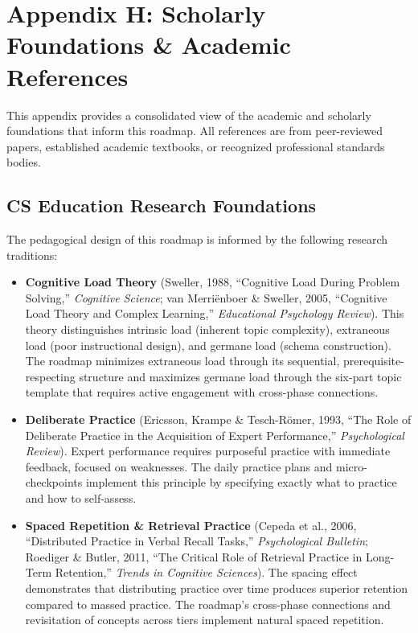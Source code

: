 \documentclass[11pt, a4paper, oneside]{report}
\begin{document}
{{{{{{{{{{{{\chapter[Scholarly Foundations]{Appendix H: Scholarly Foundations \& Academic References}

This appendix provides a consolidated view of the academic and scholarly foundations that inform this roadmap. All references are from peer-reviewed papers, established academic textbooks, or recognized professional standards bodies.

\section*{CS Education Research Foundations}

The pedagogical design of this roadmap is informed by the following research traditions:

\begin{itemize}[leftmargin=*]
\item \textbf{Cognitive Load Theory} (Sweller, 1988, ``Cognitive Load During Problem Solving,'' \emph{Cognitive Science}; van Merri\"enboer \& Sweller, 2005, ``Cognitive Load Theory and Complex Learning,'' \emph{Educational Psychology Review}). This theory distinguishes intrinsic load (inherent topic complexity), extraneous load (poor instructional design), and germane load (schema construction). The roadmap minimizes extraneous load through its sequential, prerequisite-respecting structure and maximizes germane load through the six-part topic template that requires active engagement with cross-phase connections.

\item \textbf{Deliberate Practice} (Ericsson, Krampe \& Tesch-R\"omer, 1993, ``The Role of Deliberate Practice in the Acquisition of Expert Performance,'' \emph{Psychological Review}). Expert performance requires purposeful practice with immediate feedback, focused on weaknesses. The daily practice plans and micro-checkpoints implement this principle by specifying exactly what to practice and how to self-assess.

\item \textbf{Spaced Repetition \& Retrieval Practice} (Cepeda et al., 2006, ``Distributed Practice in Verbal Recall Tasks,'' \emph{Psychological Bulletin}; Roediger \& Butler, 2011, ``The Critical Role of Retrieval Practice in Long-Term Retention,'' \emph{Trends in Cognitive Sciences}). The spacing effect demonstrates that distributing practice over time produces superior retention compared to massed practice. The roadmap's cross-phase connections and revisitation of concepts across tiers implement natural spaced repetition.


\end{itemize}}}}}}}}}}}}}
\end{document}
